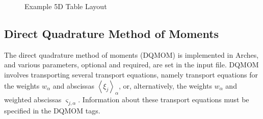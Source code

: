 \newpage
\begin{figure}[H]
 \begin{center}
   \caption{Example 5D Table Layout}\label{fig:table_ex}
   \end{center}
\end{figure}














\subsection{Direct Quadrature Method of Moments}

The direct quadrature method of moments (DQMOM) is implemented in Arches, and various parameters, optional and required, are set in the input file. DQMOM involves transporting several transport equations, namely transport equations for the weights $w_{\alpha}$ and abscissas $ \left< \xi_{j} \right>_{\alpha}$, or, alternatively, the weights $w_{\alpha}$ and weighted abscissas $\varsigma_{j,\alpha}$.  Information about these transport equations must be specified in the DQMOM tags.

